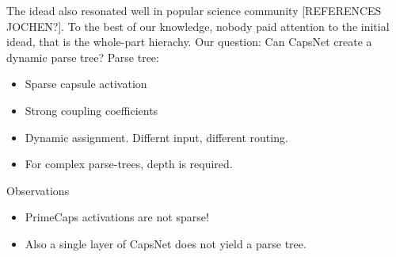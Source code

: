 \documentclass{article}
\begin{document}
The idead also resonated well in popular science community [REFERENCES JOCHEN?].
To the best of our knowledge, nobody paid attention to the initial idead, that is the whole-part hierachy.
Our question: Can CapsNet create a dynamic parse tree?
Parse tree:
\begin{itemize}
	\item Sparse capsule activation
	\item Strong coupling coefficients
	\item Dynamic assignment. Differnt input, different routing.
	\item For complex parse-trees, depth is required.
\end{itemize}

Observations
\begin{itemize}
	\item PrimeCaps activations are not sparse!
	\item Also a single layer of CapsNet does not yield a parse tree.
\end{itemize}
\end{document}
